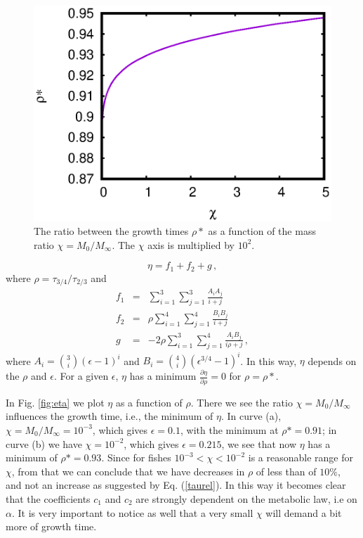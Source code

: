 \begin{figure}%
\centering
\includegraphics[width=.8\columnwidth]{minimum_rho_chi}%
\caption{ The ratio between the growth times $\rho*$ as a function of the mass ratio $\chi=M_0/M_\infty$.  The $\chi$ axis is multiplied by $10^2$. }
\label{fig:rho}
\end{figure}


\begin{equation}
\eta  = f_1 + f_2 + g\,,
\end{equation}
where $\rho=\tau_{3/4}/\tau_{2/3}$ and
\begin{eqnarray}
f_{1}&=&\sum_{i = 1}^3\sum_{j = 1}^3 \frac{A_{i}A_{j}}{i+j}\\
f_{2}&=&\rho\sum_{i = 1}^4\sum_{j = 1}^4 \frac{B_{i}B_{j}}{i+j}\\
g&=&-2\rho\sum_{i = 1}^3\sum_{j = 1}^4 \frac{A_{i}B_{j}}{i\rho+j}\,,
\end{eqnarray}
where $A_i=\binom{3}{i}(\epsilon -1)^{i}$ and $B_i=\binom{4}{i}(\epsilon^{3/4} -1)^{i}$. In this way, $\eta$ depends on the $\rho$ and $\epsilon$. For a given $\epsilon$, $\eta$ has a minimum $\frac{\partial \eta}{\partial \rho}=0$ for $\rho=\rho*$.

In  Fig. \ref{fig:eta} we plot $\eta$ as a function of $\rho$. There we see the ratio  $\chi=M_0/M_{\infty}$ influences the growth time, i.e., the minimum of $\eta$.  In curve (a), $\chi=M_0/M_{\infty}=10^{-3}$, which gives $\epsilon = 0.1$, with the minimum at $\rho*=0.91$; in curve (b) we have $\chi=10^{-2}$, which gives $\epsilon=0.215$, we see that now $\eta$ has a minimum of $\rho* = 0.93$. Since for fishes  $10^{-3} < \chi < 10^{-2}$ is a reasonable range for $\chi$, from that we can conclude that we have decreases in $\rho$ of less than of $10\%$, and not an increase as suggested by Eq. (\ref{taurel}).  In this way it becomes clear that the coefficients $c_1$ and $c_2$ are strongly dependent on the metabolic law, i.e on  $\alpha$.
It is very important to notice as well that a very small $\chi$ will demand a bit more of  growth time.

